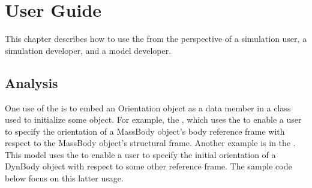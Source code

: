 
\chapter{User Guide}\label{ch:user}

This chapter describes how to use the \ModelDesc from the 
perspective of a simulation user, a simulation developer,
and a model developer.

\section{Analysis}
One use of the \ModelDesc is to embed an Orientation object as a
data member in a class used to initialize some object.
For example, the , which uses the \ModelDesc to enable a user
to specify the orientation of a MassBody object's body reference frame
with respect to the MassBody object's structural frame.
Another example is in the . This model uses
the \ModelDesc to enable a user to specify the initial orientation of a DynBody
object with respect to some other reference frame. The sample code below focus on
this latter usage.

